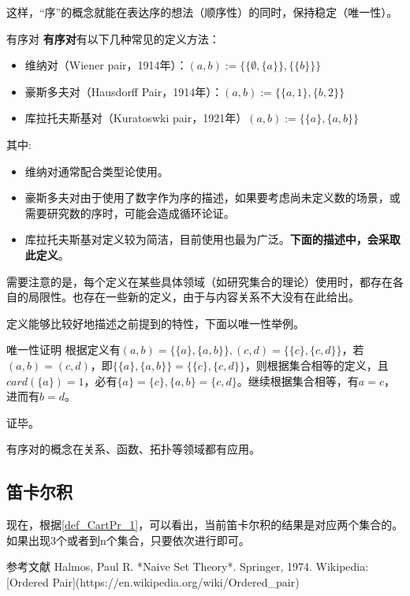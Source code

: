 这样，“序”的概念就能在表达序的想法（顺序性）的同时，保持稳定（唯一性）。

\begin{definition}{有序对}
\textbf{有序对}有以下几种常见的定义方法：
\begin{itemize}
\item 维纳对（Wiener pair，1914年）：$(a, b):= \{\{\emptyset,\{ a\}\}, \{\{b\}\}\} $
\item 豪斯多夫对（Hausdorff Pair，1914年）：$ (a, b):= \{\{a, 1\}, \{b, 2\}\} $
\item 库拉托夫斯基对（Kuratoswki pair，1921年）$(a, b) := \{\{a\}, \{a, b\}\}$
\end{itemize}
\end{definition}
其中:
\begin{itemize}
\item 维纳对通常配合类型论使用。
\item 豪斯多夫对由于使用了数字作为序的描述，如果要考虑尚未定义数的场景，或需要研究数的序时，可能会造成循环论证。
\item 库拉托夫斯基对定义较为简洁，目前使用也最为广泛。\textbf{下面的描述中，会采取此定义}。
\end{itemize}

需要注意的是，每个定义在某些具体领域（如研究集合的理论）使用时，都存在各自的局限性。也存在一些新的定义，由于与内容关系不大没有在此给出。

定义能够比较好地描述之前提到的特性，下面以唯一性举例。
\begin{example}{唯一性证明}
根据定义有$(a, b) = \{\{a\}, \{a, b\}\} , (c, d) = \{\{c\}, \{c, d\}\} $，若$(a, b)=(c,d)$，即$\{\{a\}, \{a, b\}\}=\{\{c\}, \{c, d\}\}$，则根据集合相等的定义，且$card(\{a\})=1$，必有$\{a\}=\{c\},\{a, b\}=\{c, d\}$。继续根据集合相等，有$a=c$，进而有$b=d$。

证毕。
\end{example}

有序对的概念在关系、函数、拓扑等领域都有应用。

\subsection{笛卡尔积}

现在，根据\autoref{def_CartPr_1}，可以看出，当前笛卡尔积的结果是对应两个集合的。如果出现3个或者到n个集合，只要依次进行即可。

参考文献
Halmos, Paul R. *Naive Set Theory*. Springer, 1974.
Wikipedia: [Ordered Pair](https://en.wikipedia.org/wiki/Ordered_pair)